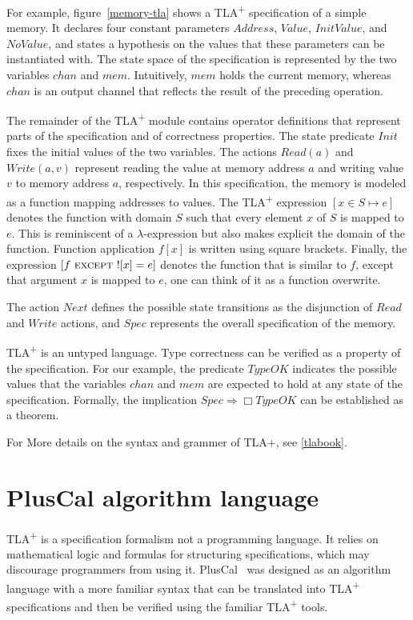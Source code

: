 \documentclass{thesul}
\newcommand{\tlaplus}{TLA\textsuperscript{+}\xspace}
\newcommand{\EXCEPT}{\textsc{except}}
\begin{document}
For example, figure~\ref{memory-tla} shows a \tlaplus specification of a simple memory. It declares four constant parameters $Address$, $Value$, $InitValue$, and $NoValue$, and states a hypothesis on the values that these parameters can be instantiated with. The state space of the specification is represented by the two variables $chan$ and $mem$. Intuitively, $mem$ holds the current memory, whereas $chan$ is an output channel that reflects the result of the preceding operation.

The remainder of the \tlaplus module contains operator definitions that represent parts of the specification and of correctness properties. The state predicate $Init$ fixes the initial values of the two variables. The actions $Read(a)$ and $Write(a,v)$ represent reading the value at memory address $a$ and writing value $v$ to memory address $a$, respectively. In this specification, the memory is modeled as a function mapping addresses to values. The \tlaplus expression $[x \in S \mapsto e]$ denotes the function with domain $S$ such that every element $x$ of $S$ is mapped to $e$. This is reminiscent of a $\lambda$-expression but also makes explicit the domain of the function. Function application $f[x]$ is written using square brackets. Finally, the expression $[f\ \EXCEPT\ ![x] = e]$ denotes the function that is similar to $f$, except that argument $x$ is mapped to $e$, one can think of it as a function overwrite.

The action $Next$ defines the possible state transitions as the disjunction of $Read$ and $Write$ actions, and $Spec$ represents the overall specification of the memory.

\tlaplus is an untyped language. Type correctness can be verified as a property of the specification. For our example, the predicate $TypeOK$ indicates the possible values that the variables $chan$ and $mem$ are expected to hold at any state of the specification. Formally, the implication $Spec \Rightarrow \Box TypeOK$ can be established as a theorem.

\bigskip


For More details on the syntax and grammer of TLA+, see \ref{tlabook}.

\section{PlusCal algorithm language}

\tlaplus is a specification formalism not a programming language. It relies on mathematical logic and formulas for structuring specifications, which may discourage programmers from using it. PlusCal~\cite{pcalAlgo} was designed as an algorithm language with a more familiar syntax that can be translated into \tlaplus specifications and then be verified using the familiar \tlaplus tools.
\end{document}
